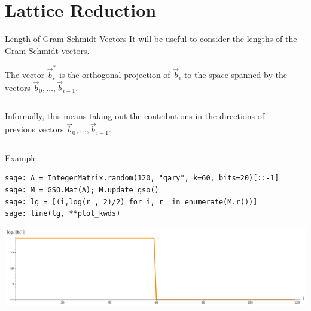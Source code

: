 \documentclass[xcolor=table,10pt,aspectratio=169]{beamer}
\begin{document}
\section{Lattice Reduction}
\label{sec:orgea2cb8b}
\begin{frame}[label={sec:orga96d8be}]{Length of Gram-Schmidt Vectors}
It will be useful to consider the lengths of the Gram-Schmidt vectors.

The vector \(\vec{b}^*_i\) is the orthogonal projection of \(\vec{b}_i\) to the space spanned by the vectors \(\vec{b}_0, \ldots, \vec{b}_{i-1}\).

\begin{columns}
\begin{column}{0.45\columnwidth}
Informally, this means taking out the contributions in the directions of previous vectors  \(\vec{b}_0, \ldots, \vec{b}_{i-1}\).
\end{column}

\begin{column}{0.45\columnwidth}
\end{column}
\end{columns}
\end{frame}

\begin{frame}[label={sec:orgcfc4eb4},fragile]{Example}
 \lstset{language=sage,label= ,caption= ,captionpos=b,numbers=none}
\begin{lstlisting}
sage: A = IntegerMatrix.random(120, "qary", k=60, bits=20)[::-1]
sage: M = GSO.Mat(A); M.update_gso()
sage: lg = [(i,log(r_, 2)/2) for i, r_ in enumerate(M.r())]
sage: line(lg, **plot_kwds)
\end{lstlisting}

\begin{center}
\includegraphics[width=.9\linewidth]{gram-schmidt-norms.png}
\end{center}
\end{frame}
\end{document}
